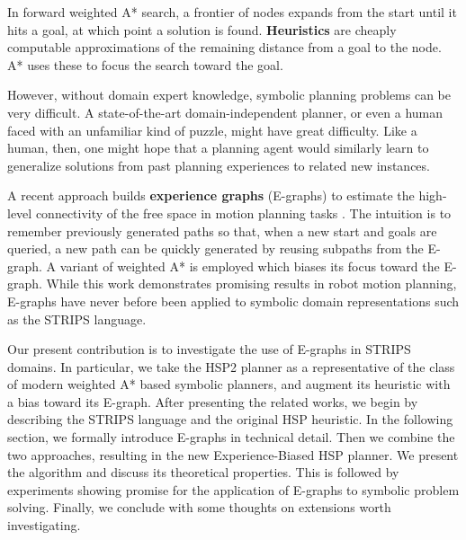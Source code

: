 \documentclass[letterpaper]{article}
\begin{document}

In forward weighted A* search, a frontier of nodes expands from the start until it hits a goal, at which point a solution is found. \textbf{Heuristics} are cheaply computable approximations of the remaining distance from a goal to the node. A* uses these to focus the search toward the goal.

However, without domain expert knowledge, symbolic planning problems can be very difficult. A state-of-the-art domain-independent planner, or even a human faced with an unfamiliar kind of puzzle, might have great difficulty. Like a human, then, one might hope that a planning agent would similarly learn to generalize solutions from past planning experiences to related new instances.

A recent approach builds \textbf{experience graphs} (E-graphs) to estimate the high-level connectivity of the free space in motion planning tasks \cite{phillips2012graphs}.
The intuition is to remember previously generated paths so that, when a new start and goals are queried, a new path can be quickly generated by reusing subpaths from the E-graph.
A variant of weighted A* is employed which biases its focus toward the E-graph.
While this work demonstrates promising results in robot motion planning, E-graphs have never before been applied to symbolic domain representations such as the STRIPS language.

Our present contribution is to investigate the use of E-graphs in STRIPS domains. In particular, we take the HSP2 planner \cite{bonet2001planning} as a representative of the class of modern weighted A* based symbolic planners, and augment its heuristic with a bias toward its E-graph. After presenting the related works, we begin by describing the STRIPS language and the original HSP heuristic. In the following section, we formally introduce E-graphs in technical detail. Then we combine the two approaches, resulting in the new Experience-Biased HSP planner. We present the algorithm and discuss its theoretical properties. This is followed by experiments showing promise for the application of E-graphs to symbolic problem solving. Finally, we conclude with some thoughts on extensions worth investigating.
\end{document}
